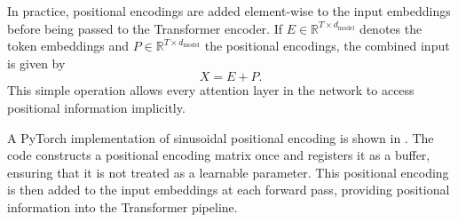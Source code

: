 In practice, positional encodings are added element-wise
to the input embeddings before being passed to the
Transformer encoder.
If $E \in \mathbb{R}^{T \times d_{\text{model}}}$ denotes
the token embeddings and $P \in \mathbb{R}^{T \times d_{\text{model}}}$
the positional encodings, the combined input is given by
\begin{equation}
X = E + P.
\end{equation}
This simple operation allows every attention layer in
the network to access positional information implicitly.

A PyTorch implementation of sinusoidal positional encoding
is shown in .
The code constructs a positional encoding matrix once and
registers it as a buffer, ensuring that it is not treated
as a learnable parameter.
This positional encoding is then added to the input
embeddings at each forward pass, providing
positional information into the Transformer pipeline.

